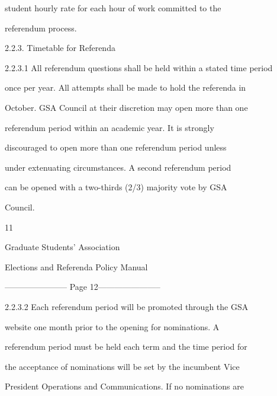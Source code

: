                student  hourly  rate  for  each  hour  of  work  committed  to  the  

               referendum process.  

  

2.2.3. Timetable for Referenda  

  

2.2.3.1        All referendum questions shall be held within a stated time period  

               once per year. All attempts shall be made to hold the referenda in  

               October. GSA Council at their discretion may open more than one  

               referendum   period   within   an   academic   year.   It   is   strongly  

               discouraged  to  open  more  than  one  referendum  period  unless  

               under  extenuating  circumstances.  A  second  referendum  period  

               can  be  opened  with  a  two-thirds  (2/3)  majority  vote  by  GSA  

               Council.   



                                                      11  

                                                                                                             

                                Graduate Students’ Association  

                          Elections and Referenda Policy Manual  

  


----------------------- Page 12-----------------------

  

2.2.3.2        Each  referendum  period  will  be  promoted  through  the  GSA  

               website  one  month  prior  to  the  opening  for  nominations.  A  

               referendum period must be held each term and the time period for  

               the acceptance of nominations will be set by the incumbent Vice  

               President Operations and Communications. If no nominations are  


